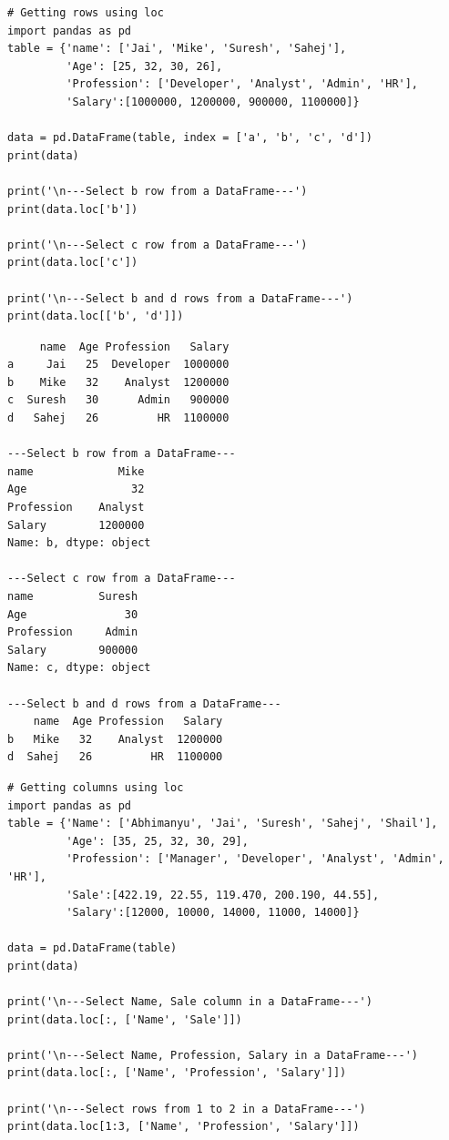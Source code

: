\documentclass[11pt]{article}
\begin{document}
\begin{verbatim}
# Getting rows using loc
import pandas as pd
table = {'name': ['Jai', 'Mike', 'Suresh', 'Sahej'],
         'Age': [25, 32, 30, 26],
         'Profession': ['Developer', 'Analyst', 'Admin', 'HR'],
         'Salary':[1000000, 1200000, 900000, 1100000]}

data = pd.DataFrame(table, index = ['a', 'b', 'c', 'd'])
print(data)

print('\n---Select b row from a DataFrame---')
print(data.loc['b'])

print('\n---Select c row from a DataFrame---')
print(data.loc['c'])

print('\n---Select b and d rows from a DataFrame---')
print(data.loc[['b', 'd']])
\end{verbatim}

\begin{verbatim}
     name  Age Profession   Salary
a     Jai   25  Developer  1000000
b    Mike   32    Analyst  1200000
c  Suresh   30      Admin   900000
d   Sahej   26         HR  1100000

---Select b row from a DataFrame---
name             Mike
Age                32
Profession    Analyst
Salary        1200000
Name: b, dtype: object

---Select c row from a DataFrame---
name          Suresh
Age               30
Profession     Admin
Salary        900000
Name: c, dtype: object

---Select b and d rows from a DataFrame---
    name  Age Profession   Salary
b   Mike   32    Analyst  1200000
d  Sahej   26         HR  1100000
\end{verbatim}

\begin{verbatim}
# Getting columns using loc
import pandas as pd
table = {'Name': ['Abhimanyu', 'Jai', 'Suresh', 'Sahej', 'Shail'],
         'Age': [35, 25, 32, 30, 29],
         'Profession': ['Manager', 'Developer', 'Analyst', 'Admin', 'HR'],
         'Sale':[422.19, 22.55, 119.470, 200.190, 44.55],
         'Salary':[12000, 10000, 14000, 11000, 14000]}

data = pd.DataFrame(table)
print(data)

print('\n---Select Name, Sale column in a DataFrame---')
print(data.loc[:, ['Name', 'Sale']])

print('\n---Select Name, Profession, Salary in a DataFrame---')
print(data.loc[:, ['Name', 'Profession', 'Salary']])

print('\n---Select rows from 1 to 2 in a DataFrame---')
print(data.loc[1:3, ['Name', 'Profession', 'Salary']])
\end{verbatim}
\end{document}

